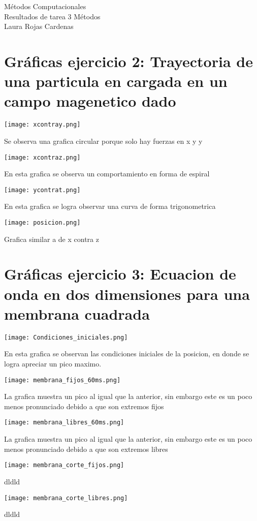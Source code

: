 \documentclass[11pt,letterpaper]{exam}
\begin{document}
\begin{center}
{\Large Métodos Computacionales} \\
Resultados de tarea 3 Métodos \\ 
Laura Rojas Cardenas\\
\end{center}


\noindent
\section{Gr\'aficas ejercicio 2: Trayectoria de una particula en cargada en un campo magenetico dado }
\begin{center}
\texttt{[image: xcontray.png]} 
\end{center}
Se observa una grafica circular porque solo hay fuerzas en x y y 

\begin{center}
\texttt{[image: xcontraz.png]} 
\end{center}
En esta grafica se observa un comportamiento en forma de espiral

\begin{center}
\texttt{[image: ycontrat.png]} 
\end{center}
En esta grafica se logra observar una curva de forma trigonometrica 

\begin{center}
\texttt{[image: posicion.png]} 
\end{center}
Grafica similar a de x contra z  



\section{Gr\'aficas ejercicio 3: Ecuacion de onda en dos dimensiones para una membrana cuadrada}

\begin{center}
\texttt{[image: Condiciones\_iniciales.png]} 
\end{center}
En esta grafica se observan las condiciones iniciales de la posicion, en donde se logra apreciar un pico maximo. 


\begin{center}
\texttt{[image: membrana\_fijos\_60ms.png]} 
\end{center}
La grafica muestra un pico al igual que la anterior, sin embargo este es un poco menos pronunciado debido a que son extremos fijos

\begin{center}
\texttt{[image: membrana\_libres\_60ms.png]} 
\end{center}
La grafica muestra un pico al igual que la anterior, sin embargo este es un poco menos pronunciado debido a que son extremos libres


\begin{center}
\texttt{[image: membrana\_corte\_fijos.png]} 
\end{center}
dldld 

\begin{center}
\texttt{[image: membrana\_corte\_libres.png]} 
\end{center}
dldld 
\end{document}
